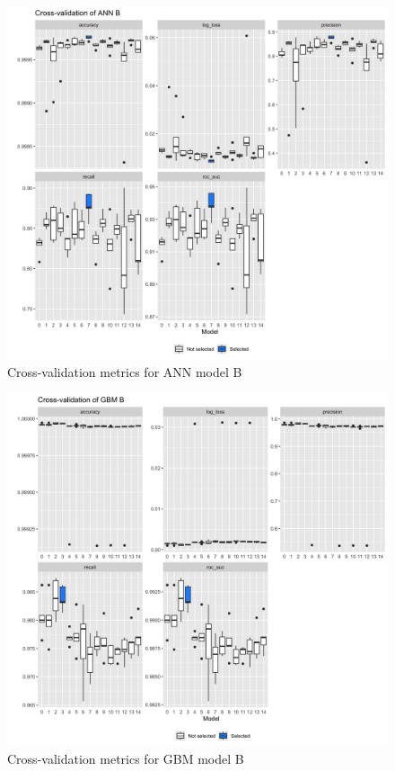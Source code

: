 \documentclass{article}
\begin{document}
\begin{figure}[H]
\centering
\includegraphics[width=0.9\linewidth]{boxplot_b_ann.png} 
\caption{Cross-validation metrics for ANN model B}
\label{cv_b_ann}
\end{figure}

\begin{figure}[H]
\centering
\includegraphics[width=0.9\linewidth]{boxplot_b_gbm.png} 
\caption{Cross-validation metrics for GBM model B}
\label{cv_b_gbm}
\end{figure}
\end{document}
